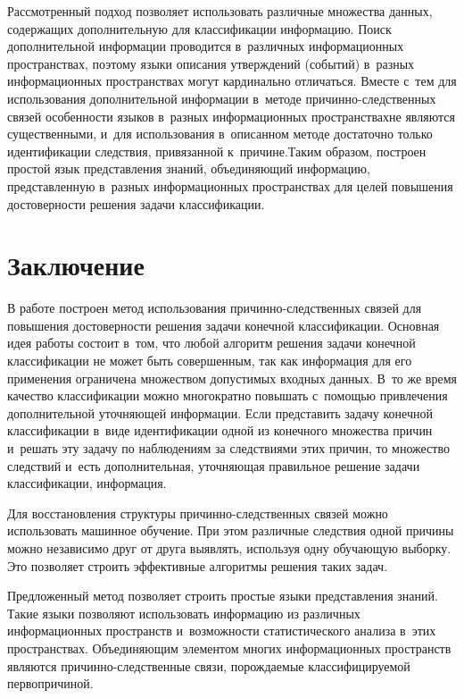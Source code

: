 \begin{multicols}{2}
  Рассмотренный подход позволяет использовать различные множества данных, 
содержащих дополнительную для классификации информацию. Поиск 
дополнительной информации проводится в~различных информационных 
пространствах, поэтому языки описания утверждений (событий) в~разных 
информационных пространствах могут кардинально отличаться. Вместе с~тем для 
использования дополнительной информации в~методе  
при\-чин\-но-след\-ст\-вен\-ных связей особенности языков в~разных 
информационных пространствах\linebreak не являются существенными, и~для 
использования в~описанном методе достаточно только идентификации следствия, 
привязанной к~причине.\linebreak Таким образом, построен простой язык представления 
знаний, объединяющий информацию, представленную в~разных информационных 
пространствах для целей повышения достоверности решения задачи 
классификации.

\vspace*{-9pt}
  
  \section{Заключение }
  
  \vspace*{-2pt}
  
  
  В работе построен метод использования при\-чин\-но-след\-ст\-вен\-ных связей для 
повышения до\-сто\-вер\-ности решения задачи конечной классификации. Основная 
идея работы со\-ст\-оит в~том, что любой алгоритм решения задачи конечной 
классификации не может быть совершенным, так как информация для его 
применения ограничена множеством допустимых входных данных. В~то же 
время качество классификации можно многократно повышать с~помощью 
привлечения дополнительной уточ\-ня\-ющей информации. Если представить задачу 
конечной классификации в~виде идентификации одной из конечного множества 
причин и~решать эту задачу по наблюдениям за следствиями этих причин, то 
множество следствий и~есть дополнительная, уточ\-ня\-ющая правильное решение 
задачи классификации, информация.
  
  Для восстановления структуры при\-чин\-но-след\-ст\-вен\-ных связей можно 
использовать машинное обуче\-ние. При этом различные следствия одной причины 
можно независимо друг от друга выявлять, используя одну обуча\-ющую выборку. 
Это позволяет строить эффективные алгоритмы решения таких задач.
  
  Предложенный метод позволяет строить прос\-тые языки пред\-став\-ле\-ния знаний. 
Такие языки позволяют использовать информацию из различных 
информационных пространств и~возможности статистического анализа в~этих 
пространствах. Объединяющим элементом многих информационных пространств 
являются при\-чин\-но-след\-ст\-вен\-ные связи, порождаемые классифицируемой 
первопричиной.


\end{multicols}
